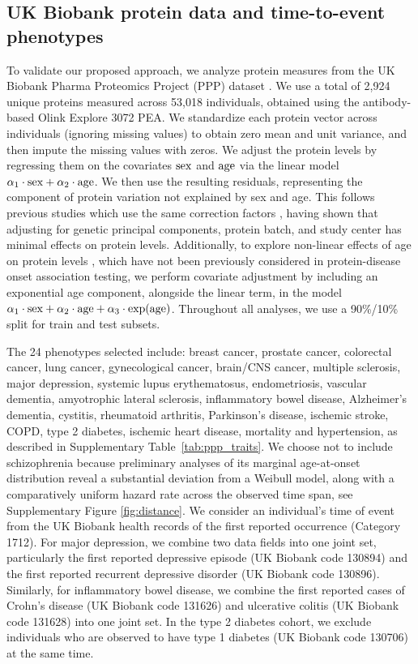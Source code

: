 \subsection{UK Biobank protein data and time-to-event phenotypes}
\label{subsection:ukb}
To validate our proposed approach, we analyze protein measures from the UK Biobank Pharma Proteomics Project (PPP) dataset \cite{sun_plasma_2023}. We use a total of 2,924 unique proteins measured across 53,018 individuals, obtained using the antibody-based Olink Explore 3072 PEA. We standardize each protein vector across individuals (ignoring missing values) to obtain zero mean and unit variance, and then impute the missing values with zeros. We adjust the protein levels by regressing them on the covariates ${\rm sex}$ and ${\rm age}$ via the linear model $\alpha_1 \cdot {\rm sex} + \alpha_2 \cdot {\rm age}$. We then use the resulting residuals, representing the component of protein variation not explained by sex and age. This follows previous studies which use the same correction factors \cite{deng_atlas_2025, gadd_blood_2024}, having shown that adjusting for genetic principal components, protein batch, and study center has minimal effects on protein levels. Additionally, to explore non-linear effects of age on protein levels \cite{Sigurdsson2025}, which have not been previously considered in protein-disease onset association testing, we perform covariate adjustment by including an exponential age component, alongside the linear term, in the model $\alpha_1 \cdot {\rm sex} + \alpha_2 \cdot {\rm age} + \alpha_3 \cdot \exp({\rm age})$. Throughout all analyses, we use a 90\%/10\% split for train and test subsets.

The 24 phenotypes selected include: breast cancer, prostate cancer, colorectal cancer, lung cancer, gynecological cancer, brain/CNS cancer, multiple sclerosis, major depression, systemic lupus erythematosus, endometriosis, vascular dementia, amyotrophic lateral sclerosis, inflammatory bowel disease, Alzheimer’s dementia, cystitis, rheumatoid arthritis, Parkinson’s disease, ischemic stroke, COPD, type 2 diabetes, ischemic heart disease, mortality and hypertension, as described in Supplementary Table~\ref{tab:ppp_traits}. We choose not to include schizophrenia because preliminary analyses of its marginal age-at-onset distribution reveal a substantial deviation from a Weibull model, along with a comparatively uniform hazard rate across the observed time span, see Supplementary Figure \ref{fig:distance}. We consider an individual's time of event from the UK Biobank health records of the first reported occurrence (Category 1712). For major depression, we combine two data fields into one joint set, particularly the first reported depressive episode (UK Biobank code 130894) and the first reported recurrent depressive disorder (UK Biobank code 130896). Similarly, for inflammatory bowel disease, we combine the first reported cases of Crohn's disease (UK Biobank code 131626) and ulcerative colitis (UK Biobank code 131628) into one joint set. In the type 2 diabetes cohort, we exclude individuals who are observed to have type 1 diabetes (UK Biobank code 130706) at the same time.


